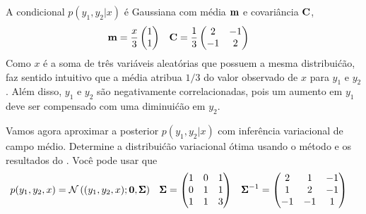 \begin{exenumerate}
    \item A condicional $p(y_1, y_2 | x)$ \'e Gaussiana com m\'edia $\mathbf{m}$ e covari\^ancia $\mathbf{C}$,
    \begin{align}
        \mathbf{m} &= \frac{x}{3} \begin{pmatrix}
            1\\
            1
        \end{pmatrix}
        &
        \mathbf{C} & = \frac{1}{3} \begin{pmatrix}
            2 &-1 \\
            -1 & 2
        \end{pmatrix}
    \end{align}
    Como $x$ \'e a soma de tr\^es vari\'aveis aleat\'orias que possuem a
    mesma distribui\'c\~ao, faz sentido intuitivo que a m\'edia atribua
    $1/3$ do valor observado de $x$ para $y_1$ e $y_2$. Al\'em disso,
    $y_1$ e $y_2$ s\~ao negativamente correlacionadas, pois um aumento em $y_1$
    deve ser compensado com uma diminui\'c\~ao em $y_2$.
    
    Vamos agora aproximar a posterior $p(y_1, y_2 | x)$ com infer\^encia variacional
    de campo m\'edio. Determine a distribui\'c\~ao variacional \'otima usando o m\'etodo e os resultados do . Voc\^e pode usar que
    \begin{align}
        p(y_1, y_2, x) &= \mathcal{N}\left( (y_1, y_2, x); \boldsymbol{0}, \pmb{\Sigma} \right) &  \pmb{\Sigma} &= \begin{pmatrix} 
            1 & 0 & 1\\
            0 & 1 & 1\\
            1 & 1 & 3
        \end{pmatrix}
        &
        \pmb{\Sigma}^{-1} &= \begin{pmatrix} 
            2 & 1 & -1\\
            1 & 2 & -1\\
            -1 & -1 & 1
        \end{pmatrix}
    \end{align}
    

\end{exenumerate}
